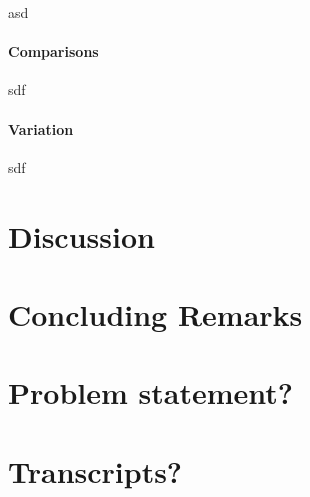 \documentclass{msuphddissertation}
\begin{document}
\begin{doublespace}
asd

\subsubsection{Comparisons}

sdf

\subsubsection{Variation}

sdf

%
%

\chapter{Discussion}

%
%

\chapter{Concluding Remarks}

%
%

\appendices

\chapter{Problem statement?}

\chapter{Transcripts?}

%
%

\end{doublespace}



\end{document}
